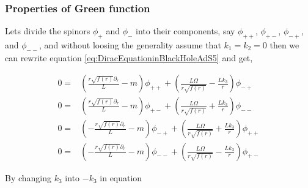 \subsubsection{Properties of Green function}  

Lets divide the spinors $\phi_{+}$ and $\phi_{-}$ into their components, say $\phi_{++}$, $\phi_{+-}$, $\phi_{-+}$, and $\phi_{--}$, and without loosing the generality assume that $k_1=k_2=0$ then we can rewrite equation \ref{eq:DiracEquationinBlackHoleAdS5} and get,

\begin{align} \label{eq:DiracEquationinBlackHoleAdS5I}
    0 =& \left( \frac{r\sqrt{f(r)}\partial_r}{L} - m \right) \phi_{++} + \left( \frac{L\Omega}{r\sqrt{f(r)}} - \frac{Lk_3}{r} \right) \phi_{-+} \nonumber\\
    0 =& \left( \frac{r\sqrt{f(r)}\partial_r}{L} - m \right) \phi_{+-} + \left( \frac{L\Omega}{r\sqrt{f(r)}} + \frac{Lk_3}{r} \right) \phi_{--} \nonumber\\
    0 =& \left(-\frac{r\sqrt{f(r)}\partial_r}{L} - m \right) \phi_{-+} + \left( \frac{L\Omega}{r\sqrt{f(r)}} + \frac{Lk_3}{r} \right) \phi_{++} \nonumber\\
    0 =& \left(-\frac{r\sqrt{f(r)}\partial_r}{L} - m \right) \phi_{--} + \left( \frac{L\Omega}{r\sqrt{f(r)}} - \frac{Lk_3}{r} \right) \phi_{+-}
\end{align}
 
By changing $k_3$ into $-k_3$ in equation  
